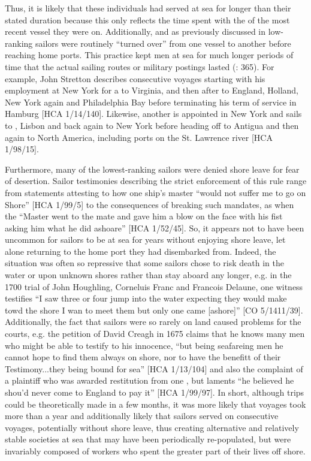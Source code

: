Thus, it is likely that these individuals had served at sea for longer than their stated duration because this only reflects the time spent with the  of the most recent vessel they were on. Additionally, and as previously discussed in  low-ranking sailors were routinely “turned over” from one vessel to another before reaching home ports. This practice kept men at sea for much longer periods of time that the actual sailing routes or military postings lasted (\citealt{AdkinsAdkins2008}: 365). For example, John Stretton describes consecutive voyages starting with his employment at New York for a  to Virginia, and then after to England, Holland, New York again and Philadelphia Bay before terminating his term of service in Hamburg [HCA 1/14/140]. Likewise, another  is appointed in New York and sails to , Lisbon and back again to New York before heading off to Antigua and then again to North America, including ports on the St. Lawrence river [HCA 1/98/15]. 

Furthermore, many of the lowest-ranking sailors were denied shore leave for fear of desertion. Sailor testimonies describing the strict enforcement of this rule range from statements attesting to how one ship’s master “would not suffer me to go on Shore” [HCA 1/99/5] to the consequences of breaking such mandates, as when the “Master went to the mate and gave him a blow on the face with his fist asking him what he did ashoare” [HCA 1/52/45]. So, it appears not to have been uncommon for sailors to be at sea for years without enjoying shore leave, let alone returning to the home port they had disembarked from. Indeed, the situation was often so repressive that some sailors chose to risk death in the water or upon unknown shores rather than stay aboard any longer, e.g. in the 1700 trial of John Houghling, Corneluis Franc and Francois Delaune, one witness testifies “I saw three or four jump into the water expecting they would make towd the shore I wan to meet them but only one came [ashore]” [CO 5/1411/39]. Additionally, the fact that sailors were so rarely on land caused problems for the courts, e.g. the petition of David Creagh in 1675 claims that he knows many men who might be able to testify to his innocence, “but being seafareing men he cannot hope to find them always on shore, nor to have the benefitt of their Testimony...they being bound for sea” [HCA 1/13/104] and also the complaint of a plaintiff who was awarded restitution from one , but laments “he believed he shou’d never come to England to pay it”  [HCA 1/99/97]. In short, although  trips could be theoretically made in a few months, it was more likely that voyages took more than a year and additionally likely that sailors served on consecutive voyages, potentially without shore leave, thus creating alternative and relatively stable societies at sea that may have been periodically re-populated, but were invariably composed of workers who spent the greater part of their lives off shore. 

